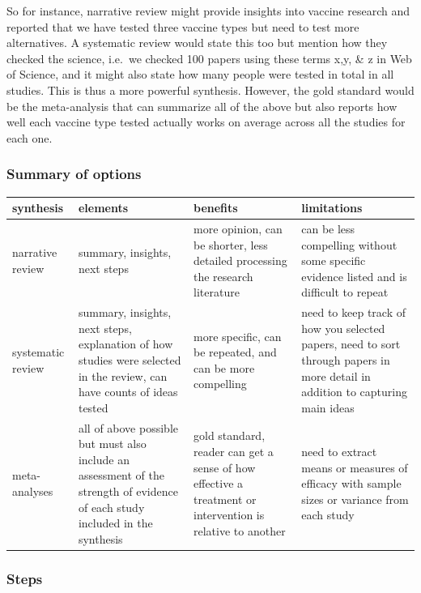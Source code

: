 \documentclass[
]{book}
\begin{document}
So for instance, narrative review might provide insights into vaccine research and reported that we have tested three vaccine types but need to test more alternatives. A systematic review would state this too but mention how they checked the science, i.e.~we checked 100 papers using these terms x,y, \& z in Web of Science, and it might also state how many people were tested in total in all studies. This is thus a more powerful synthesis. However, the gold standard would be the meta-analysis that can summarize all of the above but also reports how well each vaccine type tested actually works on average across all the studies for each one.

\hypertarget{summary-of-options}{%
\subsubsection*{Summary of options}\label{summary-of-options}}

\begin{tabular}{llll}
\toprule
synthesis & elements & benefits & limitations\\
\midrule
narrative review & summary, insights, next steps & more opinion, can be shorter, less detailed processing the research literature & can be less compelling without some specific evidence listed and is difficult to repeat\\
systematic review & summary, insights, next steps, explanation of how studies were selected in the review, can have counts of ideas tested & more specific, can be repeated, and can be more compelling & need to keep track of how you selected papers, need to sort through papers in more detail in addition to capturing main ideas\\
meta-analyses & all of above possible but must also include an assessment of the strength of evidence of each study included in the synthesis & gold standard, reader can get a sense of how effective a treatment or intervention is relative to another & need to extract means or measures of efficacy with sample sizes or variance from each study\\
\bottomrule
\end{tabular}

\hypertarget{steps-2}{%
\subsubsection*{Steps}\label{steps-2}}
\end{document}
